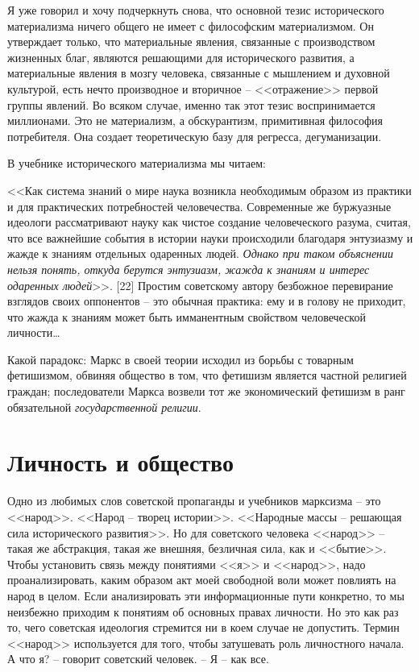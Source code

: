 \documentclass{book}
\begin{document}
Я уже говорил и хочу подчеркнуть снова, что основной тезис исторического материализма ничего общего не имеет с философским 
материализмом. Он утверждает только, что материальные явления, связанные с производством жизненных благ, являются решающими для 
исторического развития, а материальные явления в мозгу человека, связанные с мышлением и духовной культурой, есть нечто 
производное и вторичное -- <<отражение>> первой группы явлений. Во всяком случае, имен­но так этот тезис воспринимается миллионами. 
Это не матери­ализм, а обскурантизм, примитивная философия потребителя. Она создает теоретическую базу для регресса, 
дегуманизации.

В учебнике исторического материализма мы читаем:

<<Как система знаний о мире наука возникла необходимым образом из практики и для практических потребностей человечества. 
Современные же буржуазные идеологи рассматривают науку как чистое создание человеческого разума, считая, что все важнейшие 
события в истории науки происходили благодаря энтузиазму и жажде к знаниям отдельных одаренных людей. \textit{Однако при таком 
объяснении нельзя понять, откуда берутся энтузиазм, жажда к знаниям и интерес одаренных людей}>>. [22]  Простим советскому автору 
безбожное перевирание взглядов своих оппонентов -- это обычная практика: ему и в голову не приходит, что жажда к знаниям может 
быть имманентным свойством человеческой личности\ldots

Какой парадокс: Маркс в своей теории исходил из борьбы с товарным фетишизмом, обвиняя общество в том, что фети­шизм является 
частной  религией граждан; последователи Маркса возвели тот же экономический фетишизм в ранг обязательной 
\textit{государственной религии}. 


\section{Личность и общество}

Одно из любимых слов советской пропаганды и учебников марксизма -- это <<народ>>. <<Народ -- творец истории>>. <<Народные массы -- 
решающая сила исторического развития>>. Но для советского человека <<народ>> -- такая же абстракция, такая же внешняя, безличная 
сила, как и <<бытие>>. Чтобы установить связь между понятиями <<я>> и <<народ>>, надо проанализировать, каким образом акт моей 
свободной воли может повлиять на народ в целом. Если анализировать эти информационные пути конкретно, то мы неизбежно приходим к 
понятиям об основных правах личности. Но это как раз то, чего советская идеология стремится ни в коем случае не допустить. 
Термин <<народ>> ис­пользуется для того, чтобы затушевать роль личностного нача­ла. А что я? -- говорит советский человек. -- Я -- 
как все.
\end{document}
